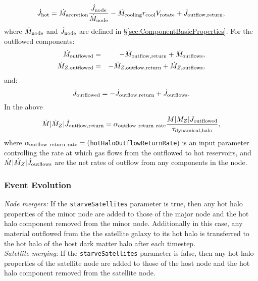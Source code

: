 \begin{equation}
 \dot{J}_{\rm hot} = \dot{M}_{\rm accretion} {\dot{J}_{\rm node} \over \dot{M}_{\rm node}} - \dot{M}_{\rm cooling} r_{\rm cool} V_{\rm rotate} + \dot{J}_{\rm outflow,return},
\end{equation}
where $\dot{M}_{\rm node}$ and $\dot{J}_{\rm node}$ are defined in \S\ref{sec:ComponentBasicProperties}. For the outflowed components:
\begin{eqnarray}
 \dot{M}_{\rm outflowed} &=& - \dot{M}_{\rm outflow,return} + \dot{M}_{\rm outflows}, \\
 \dot{M}_{Z, {\rm outflowed}} &=& - \dot{M}_{Z, {\rm outflow,return}} + \dot{M}_{Z, {\rm outflows}}, \\
\end{eqnarray}
and:
\begin{equation}
 \dot{J}_{\rm outflowed} = - \dot{J}_{\rm outflow,return} + \dot{J}_{\rm outflows}.
\end{equation}
In the above
\begin{equation}
 \dot{M}|\dot{M}_Z|\dot{J}_{\rm outflow,return} = \alpha_{\rm outflow~return~rate} {M|M_Z|J_{\rm outflowed}\over \tau_{\rm dynamical, halo}},
\end{equation}
where $\alpha_{\rm outflow~return~rate}=(${\tt hotHaloOutflowReturnRate}) is an input parameter controlling the rate at which gas flows from the outflowed to hot reservoirs, and $\dot{M}|\dot{M}_Z|\dot{J}_{\rm outflows}$ are the net rates of outflow from any components in the node.

\subsubsection{Event Evolution}

\noindent\emph{Node mergers:} If the {\tt starveSatellites} parameter is true, then any hot halo properties of the minor node are added to those of the major node and the hot halo component removed from the minor node. Additionally in this case, any material outflowed from the the satellite galaxy to its hot halo is transferred to the hot halo of the host dark matter halo after each timestep.\\

\noindent\emph{Satellite merging:} If the {\tt starveSatellites} parameter is false, then any hot halo properties of the satellite node are added to those of the host node and the hot halo component removed from the satellite node.\\

